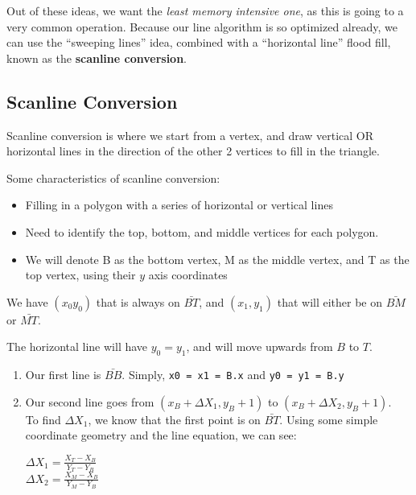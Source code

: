 \documentclass[11pt,fleqn]{article}
\theoremstyle{definition}
\begin{document}
Out of these ideas, we want the \textit{least memory intensive one}, as this is going
to a very common operation. Because our line algorithm is so optimized already, we
can use the ``sweeping lines'' idea, combined with a ``horizontal line'' flood fill,
known as the \textbf{scanline conversion}.

\subsection{Scanline Conversion}

Scanline conversion is where we start from a vertex, and draw vertical OR horizontal
lines in the direction of the other 2 vertices to fill in the triangle.

Some characteristics of scanline conversion:

\begin{itemize}
    \item Filling in a polygon with a series of horizontal or vertical lines
    \item Need to identify the top, bottom, and middle vertices for each polygon.
    \item We will denote B as the bottom vertex, M as the middle vertex, and T as the
        top vertex, using their $y$ axis coordinates
\end{itemize}

We have $(x_0 y_0)$ that is always on $\bar{BT}$, and $(x_1, y_1)$ that will either
be on $\bar{BM}$ or $\bar{MT}$.

The horizontal line will have $y_0 = y_1$, and will move upwards from $B$ to $T$.

\begin{enumerate}
    \item Our first line is $\bar{BB}$. Simply, \texttt{x0 = x1 = B.x} and \texttt{y0
        = y1 = B.y}
    \item Our second line goes from $(x_B + \Delta X_1, y_B + 1)$ to $(x_B + \Delta
        X_2, y_B + 1)$. \\
        \newline
        To find $\Delta X_1$, we know that the first point is on $\bar{BT}$. Using
        some simple coordinate geometry and the line equation, we can see: \\
        \begin{center}
            $\Delta X_1 = \frac{X_T - X_B}{Y_T - Y_B}$ \\
            $\Delta X_2 = \frac{X_M - X_B}{Y_M - Y_B}$
        \end{center}
\end{enumerate}
\end{document}
